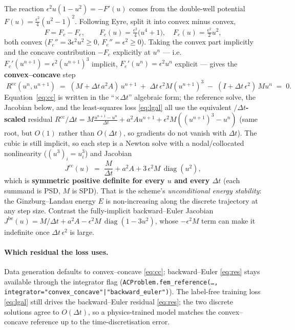 \documentclass[11pt]{article}
\newcommand{\dt}{\Delta t}
\DeclareMathOperator{\diag}{diag}
\begin{document}
The reaction $\epsilon^2 u(1-u^2)=-F'(u)$ comes from the double-well potential
$F(u)=\tfrac{\epsilon^2}{4}(u^2-1)^2$. Following Eyre, split it into convex minus convex,
\begin{equation}
  F = F_c - F_e,\qquad
  F_c(u)=\tfrac{\epsilon^2}{4}\big(u^4+1\big),\quad
  F_e(u)=\tfrac{\epsilon^2}{2}u^2 ,
\end{equation}
both convex ($F_c''=3\epsilon^2u^2\ge0$, $F_e''=\epsilon^2\ge0$). Taking the convex part
implicitly and the concave contribution $-F_e$ explicitly at $u^n$ — i.e.\
$F_c'(u^{n+1})=\epsilon^2(u^{n+1})^3$ implicit, $F_e'(u^{n})=\epsilon^2 u^{n}$ explicit —
gives the \textbf{convex--concave} step
\begin{equation}
  \boxed{\;
  R^{\mathrm{cc}}(u^{n},u^{n+1}) \;=\;
  (M+\dt\,a^2 A)\,u^{n+1} \;+\; \dt\,\epsilon^2 M (u^{n+1})^3
  \;-\; (I+\dt\,\epsilon^2)\,M u^{n} \;=\; 0 .
  \;}
  \label{eq:cc}
\end{equation}
Equation~\eqref{eq:cc} is written in the ``$\times\dt$'' algebraic form; the reference solve, the
Jacobian below, and the least-squares loss \eqref{eq:lgal} all use the equivalent
\textbf{$/\dt$-scaled} residual $R^{\mathrm{cc}}/\dt = M\frac{u^{n+1}-u^n}{\dt}+a^2Au^{n+1}
+\epsilon^2 M((u^{n+1})^3-u^n)$ (same root, but $O(1)$ rather than $O(\dt)$, so gradients do not
vanish with $\dt$). The cubic is still implicit, so each step is a Newton solve with a
nodal/collocated nonlinearity ($(u^3)_i=u_i^3$) and Jacobian
\begin{equation}
  J^{\mathrm{cc}}(u) \;=\; \frac{M}{\dt} + a^2 A + 3\,\epsilon^2 M\,\diag(u^2),
  \label{eq:cc-jac}
\end{equation}
which is \textbf{symmetric positive definite for every $u$ and every $\dt$} (each summand is
PSD, $M$ is SPD). That is the scheme's \emph{unconditional energy stability}: the
Ginzburg--Landau energy $E$ is non-increasing along the discrete trajectory at any step size.
Contrast the fully-implicit backward--Euler Jacobian
$J^{\mathrm{be}}(u)=M/\dt + a^2A - \epsilon^2 M\,\diag(1-3u^2)$, whose $-\epsilon^2 M$ term can
make it indefinite once $\dt\,\epsilon^2$ is large.

\paragraph{Which residual the loss uses.} Data generation defaults to convex--concave
\eqref{eq:cc}; backward--Euler \eqref{eq:res} stays available through the integrator flag
(\texttt{ACProblem.fem\_reference(\dots, integrator="convex\_concave"|"backward\_euler")}). The
label-free training loss \eqref{eq:lgal} still drives the backward--Euler residual
\eqref{eq:res}; the two discrete solutions agree to $O(\dt)$, so a physics-trained model matches
the convex--concave reference up to the time-discretisation error.
\end{document}

